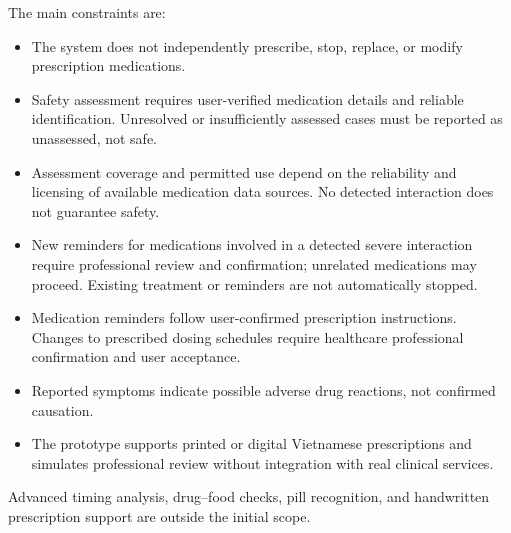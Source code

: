 The main constraints are:

\begin{itemize}
    \item The system does not independently prescribe, stop, replace, or modify prescription medications.

    \item Safety assessment requires user-verified medication details and reliable identification. Unresolved or insufficiently assessed cases must be reported as unassessed, not safe.

    \item Assessment coverage and permitted use depend on the reliability and licensing of available medication data sources. No detected interaction does not guarantee safety.

    \item New reminders for medications involved in a detected severe interaction require professional review and confirmation; unrelated medications may proceed. Existing treatment or reminders are not automatically stopped.
    
    \item Medication reminders follow user-confirmed prescription instructions. Changes to prescribed dosing schedules require healthcare professional confirmation and user acceptance.

    \item Reported symptoms indicate possible adverse drug reactions, not confirmed causation.

    \item The prototype supports printed or digital Vietnamese prescriptions and simulates professional review without integration with real clinical services.
\end{itemize}

Advanced timing analysis, drug--food checks, pill recognition, and handwritten prescription support are outside the initial scope.
